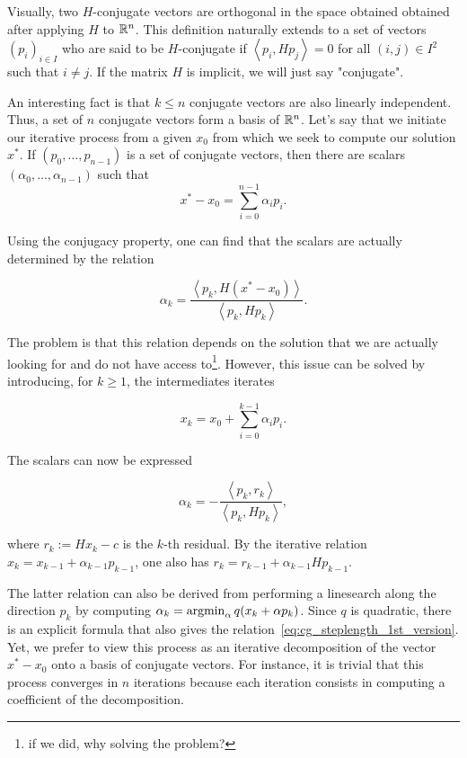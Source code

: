 \documentclass[10pt]{article}
\numberwithin{equation}{section}
\newcommand{\scal}[2]{\left\langle {#1} , {#2} \right\rangle} %
\begin{document}
	Visually, two $H$-conjugate vectors are orthogonal in the space obtained obtained after applying $H$ to ${\mathbb{R}}^n$. This definition naturally extends to a set of vectors $(p_i)_{i\in I}$ who are said to be $H$-conjugate if $\scal{p_i}{Hp_j}=0$ for all $(i,j) \in I^2$ such that $i\neq j$. If the matrix $H$ is implicit, we will just say "conjugate". 
	
	An interesting fact is that $k\le n$ conjugate vectors are also linearly independent. Thus, a set of $n$ conjugate vectors form a basis of ${\mathbb{R}}^n$. Let's say that we initiate our iterative process from a given $x_0$ from which we seek to compute our solution $x^*$. If $(p_0,\ldots,p_{n-1})$ is a set of conjugate vectors, then there are scalars $(\alpha_0,\ldots,\alpha_{n-1})$ such that
	\[ x^*-x_0 = \sum_{i=0}^{n-1} \alpha_i p_i.\]
	
	Using the conjugacy property, one can find that the scalars are actually determined by the relation
	
	\[ \alpha_k = \dfrac{\scal{p_k}{H(x^*-x_0)}}{\scal{p_k}{Hp_k}}.\]
	
	The problem is that this relation depends on the solution that we are actually looking for and do not have access to\footnote{if we did, why solving the problem?}. However, this issue can be solved by introducing, for $k\ge 1$, the intermediates iterates 
	
	\[ x_k = x_0 + \sum_{i=0}^{k-1} \alpha_i p_i.\]
	
	The scalars can now be expressed
	
	\begin{equation}\label{eq:cg_steplength_1st_version}
		\alpha_k = -\dfrac{\scal{p_k}{r_k}}{\scal{p_k}{Hp_k}},
	\end{equation}
	
	where $r_k := Hx_k - c$ is the $k$-th residual. By the iterative relation $x_{k} = x_{k-1}+\alpha_{k-1}p_{k-1}$, one also has $r_{k}=r_{k-1} + \alpha_{k-1}Hp_{k-1}$.
	
	The latter relation can also be derived from performing a linesearch along the direction $p_k$ by computing $\alpha_k = \operatorname*{argmin}_\alpha q(x_k + \alpha p_k)$. Since $q$ is quadratic, there is an explicit formula that also gives the relation~\eqref{eq:cg_steplength_1st_version}. Yet, we prefer to view this process as an iterative decomposition of the vector $x^*-x_0$ onto a basis of conjugate vectors. For instance, it is trivial that this process converges in $n$ iterations because each iteration consists in computing a coefficient of the decomposition. 
	
\end{document}
